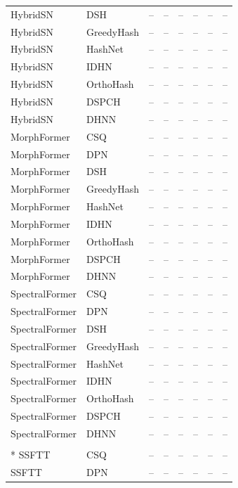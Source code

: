\begin{longtable}{llrrrrrr}
HybridSN & DSH & -- & -- & -- & -- & -- & -- \\
HybridSN & GreedyHash & -- & -- & -- & -- & -- & -- \\
HybridSN & HashNet & -- & -- & -- & -- & -- & -- \\
HybridSN & IDHN & -- & -- & -- & -- & -- & -- \\
HybridSN & OrthoHash & -- & -- & -- & -- & -- & -- \\
HybridSN & DSPCH & -- & -- & -- & -- & -- & -- \\
HybridSN & DHNN & -- & -- & -- & -- & -- & -- \\
\addlinespace
MorphFormer & CSQ & -- & -- & -- & -- & -- & -- \\
MorphFormer & DPN & -- & -- & -- & -- & -- & -- \\
MorphFormer & DSH & -- & -- & -- & -- & -- & -- \\
MorphFormer & GreedyHash & -- & -- & -- & -- & -- & -- \\
MorphFormer & HashNet & -- & -- & -- & -- & -- & -- \\
MorphFormer & IDHN & -- & -- & -- & -- & -- & -- \\
MorphFormer & OrthoHash & -- & -- & -- & -- & -- & -- \\
MorphFormer & DSPCH & -- & -- & -- & -- & -- & -- \\
MorphFormer & DHNN & -- & -- & -- & -- & -- & -- \\
\addlinespace
SpectralFormer & CSQ & -- & -- & -- & -- & -- & -- \\
SpectralFormer & DPN & -- & -- & -- & -- & -- & -- \\
SpectralFormer & DSH & -- & -- & -- & -- & -- & -- \\
SpectralFormer & GreedyHash & -- & -- & -- & -- & -- & -- \\
SpectralFormer & HashNet & -- & -- & -- & -- & -- & -- \\
SpectralFormer & IDHN & -- & -- & -- & -- & -- & -- \\
SpectralFormer & OrthoHash & -- & -- & -- & -- & -- & -- \\
SpectralFormer & DSPCH & -- & -- & -- & -- & -- & -- \\
SpectralFormer & DHNN & -- & -- & -- & -- & -- & -- \\
\addlinespace
\multicolumn{8}{c}{\textbf{NiliFossae}}\\*
\midrule
SSFTT & CSQ & -- & -- & -- & -- & -- & -- \\
SSFTT & DPN & -- & -- & -- & -- & -- & -- \\

\end{longtable}
